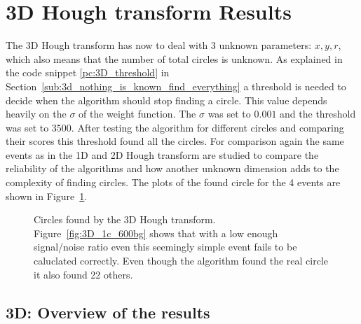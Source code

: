 \documentclass[11pt,twoside]{scrreprt}
\begin{document}
\section{3D Hough transform Results} %
\label{sec:3d_hough_transform_results}
The 3D Hough transform has now to deal with 3 unknown parameters: $x,y,r$, which also means that the number of total circles is
unknown. As explained in the code snippet \ref{pc:3D_threshold} in Section~\ref{sub:3d_nothing_is_known_find_everything} a threshold is needed to decide when the algorithm
should stop finding a circle. This value depends heavily on the $\sigma$ of the weight function. The $\sigma$ was set to $0.001$ and the threshold
was set to $3500$. After testing the algorithm for different circles and comparing their scores this threshold found all the circles.
For comparison again the same events as in the 1D and 2D Hough transform are studied to compare the reliability of the algorithms and how another
unknown dimension adds to the complexity of finding circles. The plots of the found circle for the 4 events are shown in 
Figure~\ref{fig:3D_HT_results}.


\begin{figure}[htp]
        \centering

        \caption[Circles found by the 3D Hough transform]{Circles found by the 3D Hough transform. Figure~\ref{fig:3D_1c_600bg} shows that with a low enough signal/noise ratio even this seemingly simple event fails to be caluclated correctly. Even though the algorithm found the real circle it also found 22 others.\label{fig:3D_HT_results}}
\end{figure}


\subsection{3D: Overview of the results} %
\label{ssub:3d_overview_of_the_results}
\end{document}

